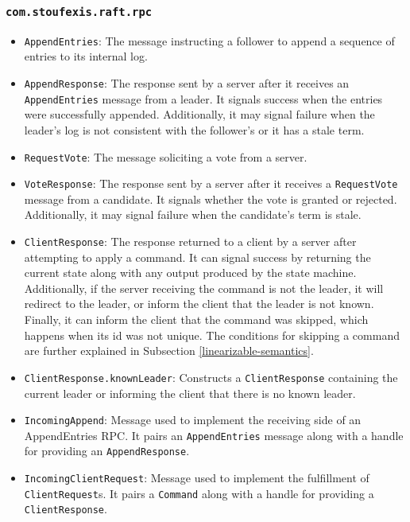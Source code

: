 \subsubsection{\lstinline|com.stoufexis.raft.rpc|}

\begin{itemize}
    \item \lstinline|AppendEntries|: The message instructing a follower to append a sequence of entries to its internal log.
    \item \lstinline|AppendResponse|: The response sent by a server after it receives an \lstinline|AppendEntries| message from a leader. It signals success when the entries were successfully appended. Additionally, it may signal failure when the leader's log is not consistent with the follower's or it has a stale term.
    \item \lstinline|RequestVote|: The message soliciting a vote from a server.
    \item \lstinline|VoteResponse|: The response sent by a server after it receives a \lstinline|RequestVote| message from a candidate. It signals whether the vote is granted or rejected. Additionally, it may signal failure when the candidate's term is stale.
    \item \lstinline|ClientResponse|: The response returned to a client by a server after attempting to apply a command. It can signal success by returning the current state along with any output produced by the state machine. Additionally, if the server receiving the command is not the leader, it will redirect to the leader, or inform the client that the leader is not known. Finally, it can inform the client that the command was skipped, which happens when its id was not unique. The conditions for skipping a command are further explained in Subsection \ref{linearizable-semantics}.
    \item \lstinline|ClientResponse.knownLeader|: Constructs a \lstinline|ClientResponse| containing the current leader or informing the client that there is no known leader.
    \item \lstinline|IncomingAppend|: Message used to implement the receiving side of an AppendEntries RPC. It pairs an \lstinline|AppendEntries| message along with a handle for providing an \lstinline|AppendResponse|.
    \item \lstinline|IncomingClientRequest|: Message used to implement the fulfillment of \lstinline|ClientRequest|s. It pairs a \lstinline|Command| along with a handle for providing a \lstinline|ClientResponse|.

\end{itemize}
